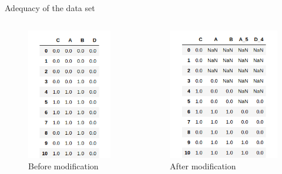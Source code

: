 \begin{frame}{Adequacy of the data set}
\begin{columns}%
    \centering
    \begin{figure}%
        \includegraphics[height=.7\textheight]{figuras/cBefore.png}
        \caption{Before modification}
    \end{figure}
    \begin{figure}
        \includegraphics[height=.7\textheight]{figuras/cAfter.png}
        \caption{After modification}
    \end{figure}
\end{columns}
\end{frame}


